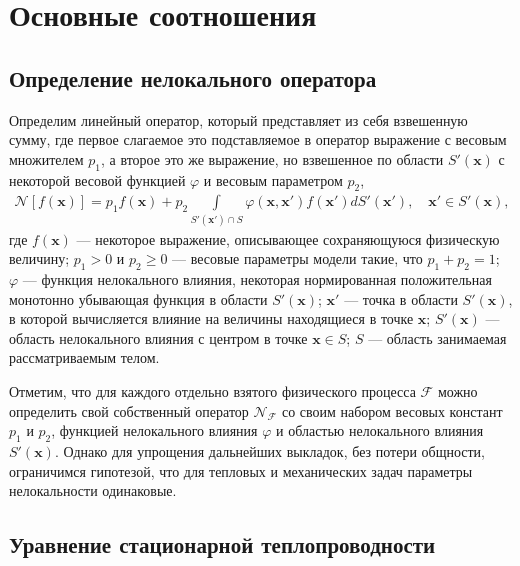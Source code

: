 \chapter{Основные соотношения}\label{ch:BasicRelations} 

\section{Определение нелокального оператора}\label{sec:BasicRelations/NonlocalOperator}

Определим линейный оператор, который представляет из себя взвешенную сумму, где первое слагаемое это подставляемое в оператор выражение с весовым множителем $p_1$, а второе это же выражение, но взвешенное по области $S'(\boldsymbol{x})$ с некоторой весовой функцией $\varphi$ и весовым параметром $p_2$,
\begin{gather}
	\label{eq:IntegroDiffOperator}
	\mathcal{N} [f(\boldsymbol{x})] = 
	p_1 f(\boldsymbol{x}) + 
	p_2 \int\limits_{S'(\boldsymbol{x}') \cap S} 
		\varphi(\boldsymbol{x}, \boldsymbol{x}') f(\boldsymbol{x}')
	dS'(\boldsymbol{x}'),
	\quad
	\boldsymbol{x}' \in S'(\boldsymbol{x}),
\end{gather}
где $f(\boldsymbol{x})$ --- некоторое выражение, описывающее сохраняющуюся физическую величину;
$p_1 > 0$ и $p_2 \geqslant 0$ --- весовые параметры модели такие, что $p_1 + p_2 = 1$;
$\varphi$ --- функция нелокального влияния, некоторая нормированная положительная монотонно убывающая функция в области $S'(\boldsymbol{x})$; 
$\boldsymbol{x}'$ --- точка в области $S'(\boldsymbol{x})$, в которой вычисляется влияние на величины находящиеся в точке $\boldsymbol{x}$;
$S'(\boldsymbol{x})$ --- область нелокального влияния с центром в точке $\boldsymbol{x} \in S$;
$S$ --- область занимаемая рассматриваемым телом.

Отметим, что для каждого отдельно взятого физического процесса $\mathcal{F}$ можно определить свой собственный оператор $\mathcal{N}_\mathcal{F}$ со своим набором весовых констант $p_1$ и $p_2$, функцией нелокального влияния $\varphi$ и областью нелокального влияния $S'(\boldsymbol{x})$. Однако для упрощения дальнейших выкладок, без потери общности, ограничимся гипотезой, что для тепловых и механических задач параметры нелокальности одинаковые.

\section{Уравнение стационарной теплопроводности}\label{sec:BasicRelations/HeatEquation}

